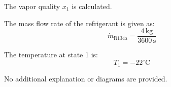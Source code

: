 The vapor quality \( x_1 \) is calculated.  

The mass flow rate of the refrigerant is given as:  
\[
\dot{m}_{\text{R134a}} = \frac{4 \, \text{kg}}{3600 \, \text{s}}
\]  

The temperature at state 1 is:  
\[
T_1 = -22^\circ\text{C}
\]  

No additional explanation or diagrams are provided.